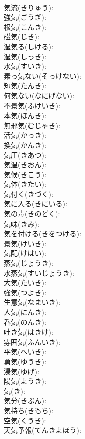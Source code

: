 \documentclass[8pt]{extreport}
\begin{document}
\begin{CJK}{UTF8}{min}
\\	気流(きりゅう): 
\\	強気(ごうぎ): 
\\	根気(こんき): 
\\	磁気(じき): 
\\	湿気る(しける): 
\\	湿気(しっき): 
\\	水気(すいき): 
\\	素っ気ない(そっけない): 
\\	短気(たんき): 
\\	何気ない(なにげない): 
\\	不景気(ふけいき): 
\\	本気(ほんき): 
\\	無邪気(むじゃき): 
\\	活気(かっき): 
\\	換気(かんき): 
\\	気圧(きあつ): 
\\	気温(きおん): 
\\	気候(きこう): 
\\	気体(きたい): 
\\	気付く(きづく): 
\\	気に入る(きにいる): 
\\	気の毒(きのどく): 
\\	気味(きみ): 
\\	気を付ける(きをつける): 
\\	景気(けいき): 
\\	気配(けはい): 
\\	蒸気(じょうき): 
\\	水蒸気(すいじょうき): 
\\	大気(たいき): 
\\	強気(つよき): 
\\	生意気(なまいき): 
\\	人気(にんき): 
\\	呑気(のんき): 
\\	吐き気(はきけ): 
\\	雰囲気(ふんいき): 
\\	平気(へいき): 
\\	勇気(ゆうき): 
\\	湯気(ゆげ): 
\\	陽気(ようき): 
\\	気(き): 
\\	気分(きぶん): 
\\	気持ち(きもち): 
\\	空気(くうき): 
\\	天気予報(てんきよほう): 

\end{CJK}
\end{document}
